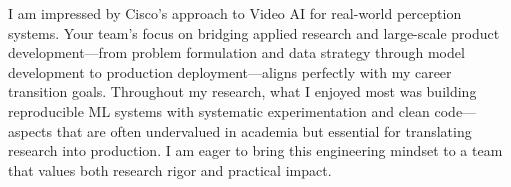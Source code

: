 \documentclass[11pt, a4paper]{awesome-cv}
\begin{document}
\begin{cvletter}

I am impressed by Cisco's approach to Video AI for real-world perception systems. Your team's focus on bridging applied research and large-scale product development—from problem formulation and data strategy through model development to production deployment—aligns perfectly with my career transition goals. Throughout my research, what I enjoyed most was building reproducible ML systems with systematic experimentation and clean code—aspects that are often undervalued in academia but essential for translating research into production. I am eager to bring this engineering mindset to a team that values both research rigor and practical impact.


%
%





%
%


\end{cvletter}
\end{document}
